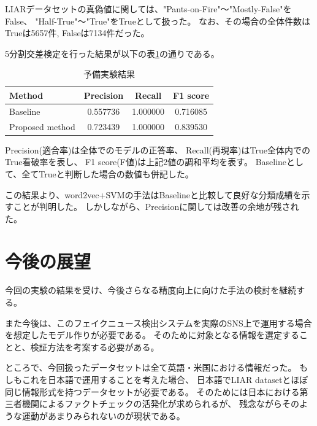 \documentclass[twocolumn, a4paper, uplatex]{UECIEresume}
\begin{document}
LIARデータセットの真偽値に関しては、"Pants-on-Fire"〜"Mostly-False"をFalse、
"Half-True"〜"True"をTrueとして扱った。
なお、その場合の全体件数はTrueは5657件, Falseは7134件だった。

5分割交差検定を行った結果が以下の表\ref{tb:result}の通りである。

\begin{table}[h]
  \begin{center}
    \caption{予備実験結果}
    \label{tb:result}
    \begin{tabular}{l c c c}
      \hline
      Method & Precision & Recall & F1 score \\
      \hline
      Baseline & 0.557736 & 1.000000 & 0.716085\\
      Proposed method & 0.723439 & 1.000000 & 0.839530\\
      \hline
    \end{tabular}
  \end{center}
\end{table}

Precision(適合率)は全体でのモデルの正答率、
Recall(再現率)はTrue全体内でのTrue看破率を表し、
F1 score(F値)は上記2値の調和平均を表す。
Baselineとして、全てTrueと判断した場合の数値も併記した。

この結果より、word2vec+SVMの手法はBaselineと比較して良好な分類成績を示すことが判明した。
しかしながら、Precisionに関しては改善の余地が残された。

\section{今後の展望}
今回の実験の結果を受け、今後さらなる精度向上に向けた手法の検討を継続する。

また今後は、このフェイクニュース検出システムを実際のSNS上で運用する場合を想定したモデル作りが必要である。
そのために対象となる情報を選定することと、検証方法を考案する必要がある。

ところで、今回扱ったデータセットは全て英語・米国における情報だった。
もしもこれを日本語で運用することを考えた場合、
日本語でLIAR datasetとほぼ同じ情報形式を持つデータセットが必要である。
そのためには日本における第三者機関によるファクトチェックの活発化が求められるが、
残念ながらそのような運動があまりみられないのが現状である。
\end{document}
